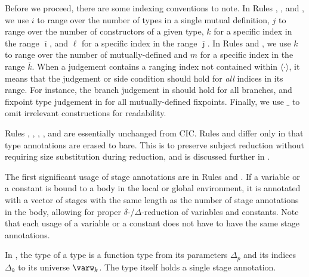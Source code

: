 \documentclass[nonacm,screen,10pt]{acmart}
\begin{document}
Before we proceed, there are some indexing conventions to note. In Rules , , and , we use $i$ to range over the number of \coinductive types in a single mutual \coinductive definition, $j$ to range over the number of constructors of a given \coinductive type, $k$ for a specific index in the range $\overline{\imath}$, and $\ell$ for a specific index in the range $\overline{\jmath}$. In Rules  and , we use $k$ to range over the number of mutually-defined \cofixpoints and $m$ for a specific index in the range $\overline{k}$. When a judgement contains a ranging index not contained within $\langle \cdot \rangle$, it means that the judgement or side condition should hold for \textit{all} indices in its range. For instance, the branch judgement in  should hold for all branches, and fixpoint type judgement in  for all mutually-defined fixpoints. Finally, we use $\_$ to omit irrelevant constructions for readability.

Rules , , ,  , and  are essentially unchanged from CIC. Rules  and  differ only in that type annotations are erased to bare. This is to preserve subject reduction without requiring size substitution during reduction, and is discussed further in \cite{cic-hat-bar}.

The first significant usage of stage annotations are in Rules  and . If a variable or a constant is bound to a body in the local or global environment, it is annotated with a vector of stages with the same length as the number of stage annotations in the body, allowing for proper $\delta$-/$\Delta$-reduction of variables and constants. Note that each usage of a variable or a constant does not have to have the same stage annotations.

In , the type of a \coinductive type is a function type from its parameters $\Delta_p$ and its indices $\Delta_k$ to its universe $\varw_k$. The \coinductive type itself holds a single stage annotation.
\end{document}
